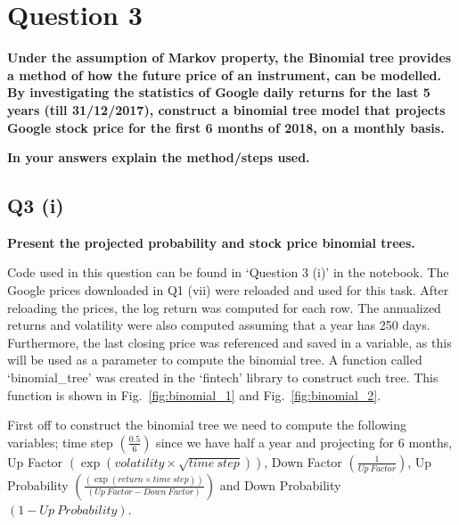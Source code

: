 \section{Question 3}\label{ssec:pt1q3}
\textbf{Under the assumption of Markov property, the Binomial tree provides a method of how the future
price of an instrument, can be modelled. By investigating the statistics of Google daily returns for the
last 5 years (till 31/12/2017), construct a binomial tree model that projects Google stock price for
the first 6 months of 2018, on a monthly basis.}

\noindent
\textbf{In your answers explain the method/steps used.}



\subsection{Q3 (i)}\label{sssec:pt1q3i}
\textbf{Present the projected probability and stock price binomial trees.}

\noindent
Code used in this question can be found in ‘Question 3 (i)’ in the notebook. The Google prices downloaded in Q1 (vii) were reloaded and used for this task. After reloading the prices, the log return was computed for each row. The annualized returns and volatility were also computed assuming that a year has 250 days. Furthermore, the last closing price was referenced and saved in a variable, as this will be used as a parameter to compute the binomial tree. A function called ‘binomial\_tree’ was created in the ‘fintech’ library to construct such tree. This function is shown in Fig.~\ref{fig:binomial_1} and Fig.~\ref{fig:binomial_2}.

\noindent
First off to construct the binomial tree we need to compute the following variables; time step $(\frac{0.5}{6})$ since we have half a year and projecting for 6 months, Up Factor $(\exp(volatility \times \sqrt{time \ step}))$, Down Factor $(\frac{1}{Up \ Factor})$, Up Probability $(\frac{(\exp(return \times time \ step))}{(Up \ Factor - Down \ Factor)})$ and Down Probability $(1 - Up \ Probability)$. 

